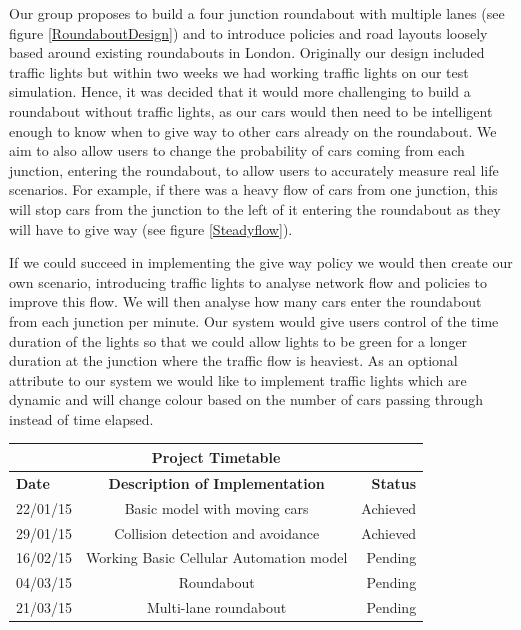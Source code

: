 \documentclass[11pt]{article}
\begin{document}
	Our group proposes to build a four junction roundabout with multiple lanes (see figure \ref{RoundaboutDesign}) and to introduce policies and road layouts loosely based around existing roundabouts in London.
	 Originally our design included traffic lights but within two weeks we had working traffic lights on our test simulation.
	  Hence, it was decided that it would more challenging to build a roundabout without traffic lights, as our cars would then need to be intelligent enough to know when to give way to other cars already on the roundabout. 
	  We aim to also allow users to change the probability of cars coming from each junction, entering the roundabout, to allow users to accurately measure real life scenarios.
	   For example, if there was a heavy flow of cars from one junction, this will stop cars from the junction to the left of it entering the roundabout as they will have to give way (see figure \ref{Steadyflow}).

	
	If we could succeed in implementing the give way policy we would then create our own scenario, introducing traffic lights to analyse network flow and policies to improve this flow. 
	We will then analyse how many cars enter the roundabout from each junction per minute. 
	Our system would give users control of the time duration of the lights so that we could allow lights to be green for a longer duration at the junction where the traffic flow is heaviest. 
	As an optional attribute to our system we would like to implement traffic lights which are dynamic and will change colour based on the number of cars passing through instead of time elapsed. \\
	
	\begin{tabular}{ | l | c | r | }
		\hline
		\multicolumn{3}{|c|}{\bf{Project Timetable}}  \\ \hline
		\bf{Date} & \bf{Description of Implementation} & \bf{Status} \\ \hline
		22/01/15 & Basic model with moving cars &  Achieved \\ \hline
		29/01/15 & Collision detection and avoidance & Achieved \\ \hline
		16/02/15 & Working Basic Cellular Automation model & Pending \\ \hline
		04/03/15 & Roundabout & Pending \\ \hline
		21/03/15 & Multi-lane roundabout & Pending \\ \hline
		
	\end{tabular}\\\\
\end{document}
